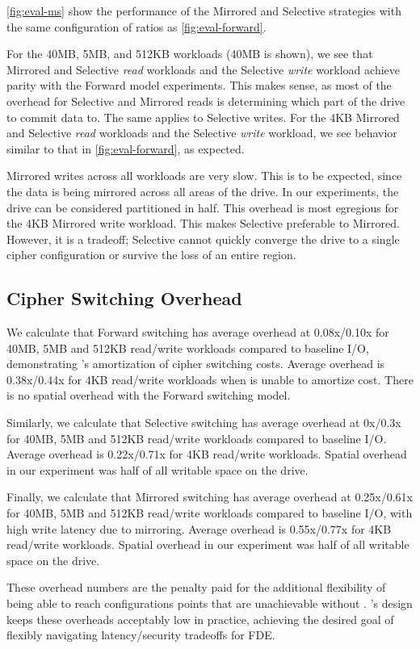 

\cref{fig:eval-ms} show the performance of the Mirrored and Selective strategies
with the same configuration of ratios as \cref{fig:eval-forward}.

For the 40MB, 5MB, and 512KB workloads (40MB is shown), we see that Mirrored and
Selective {\em read} workloads and the Selective {\em write} workload achieve
parity with the Forward model experiments. This makes sense, as most of the
overhead for Selective and Mirrored reads is determining which part of the drive
to commit data to. The same applies to Selective writes. For the 4KB Mirrored
and Selective {\em read} workloads and the Selective {\em write} workload, we
see behavior similar to that in \cref{fig:eval-forward}, as expected.

Mirrored writes across all workloads are very slow. This is to be expected,
since the data is being mirrored across all areas of the drive. In our
experiments, the drive can be considered partitioned in half. This overhead is
most egregious for the 4KB Mirrored write workload. This makes Selective
preferable to Mirrored. However, it is a tradeoff; Selective cannot quickly
converge the drive to a single cipher configuration or survive the loss of an
entire region.


\subsection{Cipher Switching Overhead}\label{subsec:eval-overhead}

We calculate that Forward switching has average overhead at 0.08x/0.10x for
40MB, 5MB and 512KB read/write workloads compared to baseline I/O, demonstrating
\sys's amortization of cipher switching costs. Average overhead is\\0.38x/0.44x
for 4KB read/write workloads when \sys is unable to amortize cost. There is no
spatial overhead with the Forward switching model.

Similarly, we calculate that Selective switching has average overhead at 0x/0.3x
for 40MB, 5MB and 512KB read/write workloads compared to baseline I/O. Average
overhead is 0.22x/0.71x for 4KB read/write workloads. Spatial overhead in our
experiment was half of all writable space on the drive.

Finally, we calculate that Mirrored switching has average overhead at
0.25x/0.61x for 40MB, 5MB and 512KB read/write workloads compared to baseline
I/O, with high write latency due to mirroring. Average overhead is 0.55x/0.77x
for 4KB read/write workloads. Spatial overhead in our experiment was half of all
writable space on the drive.

These overhead numbers are the penalty paid for the additional flexibility of
being able to reach configurations points that are unachievable without \sys.
\sys's design keeps these overheads acceptably low in practice, achieving the
desired goal of flexibly navigating latency/security tradeoffs for FDE.

